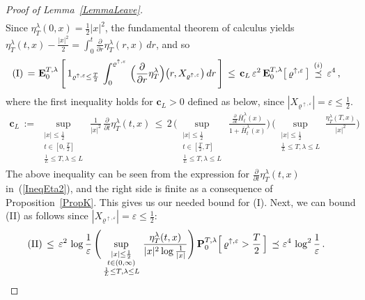 \documentclass[10pt]{article}
\def\stackrel#1#2{\mathrel{\mathop{#2}\limits^{#1}}}
\numberwithin{equation}{section}
\theoremstyle{definition}
\begin{document}
\begin{proof}[Proof of Lemma~\ref{LemmaLeave}]
\begin{align*}
\end{align*}
  Since $\eta_{T}^{\lambda}(0, x)=\frac{1}{2}|x|^2$, the fundamental theorem of calculus yields $
    \eta_{T}^{\lambda}(t, x)- \frac{|x|^2}{2}= \int_0^{t}  \frac{\partial}{\partial r}\eta_{T}^{\lambda}(r, x) \,dr
$, and so
\begin{align*}
\textup{(I)} \,= \,&\, \mathbf{E}_{0}^{T,\lambda}\left[\,1_{ \varrho^{\uparrow, \varepsilon}\leq \frac{T}{2}  }\,\int_0^{\varrho^{\uparrow, \varepsilon}  }\,\Big(\frac{\partial}{\partial r}\eta_{T}^{\lambda}\Big)\big(r, X_{\varrho^{\uparrow, \varepsilon}}\big)\, dr \,\right] \,\leq \, \mathbf{c}_L\,\varepsilon^2 \,\mathbf{E}_{0}^{T,\lambda}\big[\,\varrho^{\uparrow, \varepsilon} \, \big] \,\stackrel{ (i) }{\preceq}\, \varepsilon^4 \,,
\end{align*}
where the first inequality holds for $ \mathbf{c}_L>0$   defined as below, since   $|X_{ \varrho^{\uparrow, \varepsilon}  }|= \varepsilon \leq \frac{1}{2}$.
\begin{align*}
    \mathbf{c}_L\, :=\,  \sup_{\substack{ |x|\leq \frac{1}{2} \\  t\in [0,\frac{T}{2}] \\  \frac{1}{L}  \leq  T,\lambda \leq L   }   }\,\frac{1}{|x|^2}\, \frac{\partial}{\partial t}\eta_{T}^{\lambda}(t, x)  \,\leq \, 2\,\Bigg( \sup_{\substack{ |x|\leq \frac{1}{2}  \\  t\in [\frac{T}{2},T] \\  \frac{1}{L}  \leq  T,\lambda \leq L   }   } \,\frac{ \frac{\partial}{\partial t}\bar{H}_{t}^{\lambda}(x)  }{ 1+\bar{H}_{t}^{\lambda}(x) } \Bigg)\, \Bigg(\sup_{\substack{ |x|\leq \frac{1}{2} \\  \frac{1}{L}  \leq  T,\lambda \leq L   }  }
 \frac{\eta_{T}^{\lambda}(T, x)}{|x|^2}\Bigg) 
\end{align*}
The above inequality can be seen from the expression for $ \frac{\partial}{\partial t}\eta_{T}^{\lambda}(t, x)$ in~(\ref{IneqEta2}), and the right side  is finite as a consequence of Proposition~\ref{PropK}.  This gives us our needed bound for (I).
Next, we can bound (II) as follows since $|X_{\varrho^{\uparrow, \varepsilon}}|= \varepsilon\leq \frac{1}{2}$:
 \begin{align}\label{(II)Bound}
\textup{(II)} \,\leq \,\varepsilon^2\,\log \frac{1}{\varepsilon} \, \Bigg(\sup_{ \substack{ |x| \leq \frac{1}{2}\\ t\in (0,\infty)  \\  \frac{1}{L}  \leq  T,\lambda \leq L  }    } \,\frac{ \eta^{\lambda}_T(t,x)   }{ |x|^2\log \frac{1}{|x|}  } \Bigg)\, \mathbf{P}_{0}^{T,\lambda}\Big[ \,\varrho^{\uparrow, \varepsilon} > \frac{T}{2} \,  \Big] \,\preceq\,&\,\varepsilon^4\, \log^2\frac{1}{\varepsilon} \,.

\end{align}
\end{proof}
\end{document}
